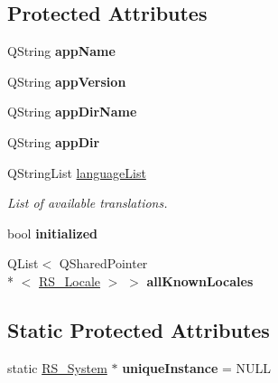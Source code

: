 \subsection*{Protected Attributes}
\begin{DoxyCompactItemize}
\item 
\hypertarget{classRS__System_a8fd06bdb3020dd287551ff874368489a}{Q\-String {\bfseries app\-Name}}\label{classRS__System_a8fd06bdb3020dd287551ff874368489a}

\item 
\hypertarget{classRS__System_a9670c06884e117f2fdf174bde9cbc463}{Q\-String {\bfseries app\-Version}}\label{classRS__System_a9670c06884e117f2fdf174bde9cbc463}

\item 
\hypertarget{classRS__System_abd8d53c8633bd2a17f3a23c6e6d653e5}{Q\-String {\bfseries app\-Dir\-Name}}\label{classRS__System_abd8d53c8633bd2a17f3a23c6e6d653e5}

\item 
\hypertarget{classRS__System_af9baa77dd73f92114c57125c495177d9}{Q\-String {\bfseries app\-Dir}}\label{classRS__System_af9baa77dd73f92114c57125c495177d9}

\item 
\hypertarget{classRS__System_adc8e4180334c0e718781af4c18b41426}{Q\-String\-List \hyperlink{classRS__System_adc8e4180334c0e718781af4c18b41426}{language\-List}}\label{classRS__System_adc8e4180334c0e718781af4c18b41426}

\begin{DoxyCompactList}\small\item\em List of available translations. \end{DoxyCompactList}\item 
\hypertarget{classRS__System_a402173e1050d468f6b194240682f4c5b}{bool {\bfseries initialized}}\label{classRS__System_a402173e1050d468f6b194240682f4c5b}

\item 
\hypertarget{classRS__System_ad6502aa22d099e1a4dd69715570b4ec9}{Q\-List$<$ Q\-Shared\-Pointer\\*
$<$ \hyperlink{classRS__Locale}{R\-S\-\_\-\-Locale} $>$ $>$ {\bfseries all\-Known\-Locales}}\label{classRS__System_ad6502aa22d099e1a4dd69715570b4ec9}

\end{DoxyCompactItemize}
\subsection*{Static Protected Attributes}
\begin{DoxyCompactItemize}
\item 
\hypertarget{classRS__System_a81d6b9f13bea1798cc3d81f2d11c53aa}{static \hyperlink{classRS__System}{R\-S\-\_\-\-System} $\ast$ {\bfseries unique\-Instance} = N\-U\-L\-L}\label{classRS__System_a81d6b9f13bea1798cc3d81f2d11c53aa}

\end{DoxyCompactItemize}


